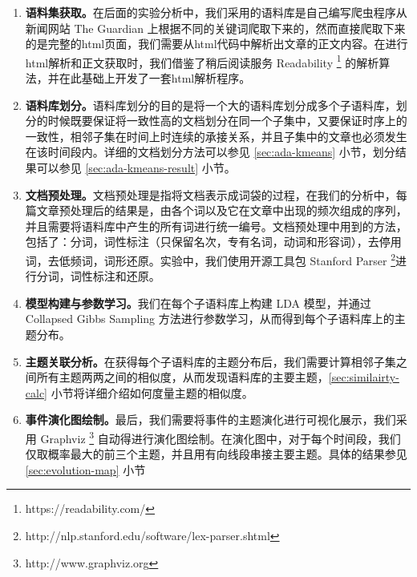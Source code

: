 \begin{enumerate}[(1)]
\item \textbf{语料集获取。}在后面的实验分析中，我们采用的语料库是自己编写爬虫程序从新闻网站  The Guardian 上根据不同的关键词爬取下来的，然而直接爬取下来的是完整的html页面，我们需要从html代码中解析出文章的正文内容。在进行html解析和正文获取时，我们借鉴了稍后阅读服务 Readability \footnote{https://readability.com/} 的解析算法，并在此基础上开发了一套html解析程序。
\item \textbf{语料库划分。}语料库划分的目的是将一个大的语料库划分成多个子语料库，划分的时候既要保证将一致性高的文档划分在同一个子集中，又要保证时序上的一致性，相邻子集在时间上时连续的承接关系，并且子集中的文章也必须发生在该时间段内。详细的文档划分方法可以参见 \ref{sec:ada-kmeans} 小节，划分结果可以参见 \ref{sec:ada-kmeans-result} 小节。
\item \textbf{文档预处理。}文档预处理是指将文档表示成词袋的过程，在我们的分析中，每篇文章预处理后的结果是，由各个词以及它在文章中出现的频次组成的序列，并且需要将语料库中产生的所有词进行统一编号。文档预处理中用到的方法，包括了：分词，词性标注（只保留名次，专有名词，动词和形容词），去停用词，去低频词，词形还原。实验中，我们使用开源工具包 Stanford Parser \footnote{http://nlp.stanford.edu/software/lex-parser.shtml}进行分词，词性标注和还原。
\item \textbf{模型构建与参数学习。}我们在每个子语料库上构建 LDA 模型，并通过 Collapsed Gibbs Sampling \cite{griffiths2004finding, heinrich2005parameter} 方法进行参数学习，从而得到每个子语料库上的主题分布。
\item \textbf{主题关联分析。}在获得每个子语料库的主题分布后，我们需要计算相邻子集之间所有主题两两之间的相似度，从而发现语料库的主要主题，\ref{sec:similairty-calc} 小节将详细介绍如何度量主题的相似度。
\item \textbf{事件演化图绘制。}最后，我们需要将事件的主题演化进行可视化展示，我们采用 Graphviz \footnote{http://www.graphviz.org} 自动得进行演化图绘制。在演化图中，对于每个时间段，我们仅取概率最大的前三个主题，并且用有向线段串接主要主题。具体的结果参见 \ref{sec:evolution-map} 小节
\end{enumerate}

